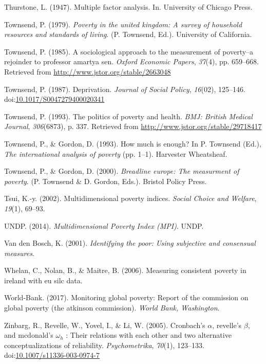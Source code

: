 \documentclass[]{book}
\begin{document}
\leavevmode\hypertarget{ref-Thurstone1947}{}%
Thurstone, L. (1947). Multiple factor analysis. In. University of Chicago Press.

\leavevmode\hypertarget{ref-Townsend1979}{}%
Townsend, P. (1979). \emph{Poverty in the united kingdom: A survey of household resources and standards of living}. (P. Townsend, Ed.). University of California.

\leavevmode\hypertarget{ref-Townsend1985}{}%
Townsend, P. (1985). A sociological approach to the measurement of poverty--a rejoinder to professor amartya sen. \emph{Oxford Economic Papers}, \emph{37}(4), pp. 659--668. Retrieved from \url{http://www.jstor.org/stable/2663048}

\leavevmode\hypertarget{ref-Townsend1987}{}%
Townsend, P. (1987). Deprivation. \emph{Journal of Social Policy}, \emph{16}(02), 125--146. doi:\href{https://doi.org/10.1017/S0047279400020341}{10.1017/S0047279400020341}

\leavevmode\hypertarget{ref-Townsend1993}{}%
Townsend, P. (1993). The politics of poverty and health. \emph{BMJ: British Medical Journal}, \emph{306}(6873), p. 337. Retrieved from \url{http://www.jstor.org/stable/29718417}

\leavevmode\hypertarget{ref-Townsend1993d}{}%
Townsend, P., \& Gordon, D. (1993). How much is enough? In P. Townsend (Ed.), \emph{The international analysis of poverty} (pp. 1--1). Harvester Wheatsheaf.

\leavevmode\hypertarget{ref-Townsend2000}{}%
Townsend, P., \& Gordon, D. (2000). \emph{Breadline europe: The measurment of poverty}. (P. Townsend \& D. Gordon, Eds.). Bristol Policy Press.

\leavevmode\hypertarget{ref-Tsui2002}{}%
Tsui, K.-y. (2002). Multidimensional poverty indices. \emph{Social Choice and Welfare}, \emph{19}(1), 69--93.

\leavevmode\hypertarget{ref-UNDP2014}{}%
UNDP. (2014). \emph{Multidimensional Poverty Index (MPI)}. UNDP.

\leavevmode\hypertarget{ref-VandenBosch2001}{}%
Van den Bosch, K. (2001). \emph{Identifying the poor: Using subjective and consensual measures}.

\leavevmode\hypertarget{ref-Whelan2006a}{}%
Whelan, C., Nolan, B., \& Maitre, B. (2006). Measuring consistent poverty in ireland with eu silc data.

\leavevmode\hypertarget{ref-Bank2017}{}%
World-Bank. (2017). Monitoring global poverty: Report of the commission on global poverty (the atkinson commission). \emph{World Bank, Washington}.

\leavevmode\hypertarget{ref-Zinbarg2005}{}%
Zinbarg, R., Revelle, W., Yovel, I., \& Li, W. (2005). Cronbach's \(\alpha\), revelle's \(\beta\), and mcdonald's \(\omega_h\) : Their relations with each other and two alternative conceptualizations of reliability. \emph{Psychometrika}, \emph{70}(1), 123--133. doi:\href{https://doi.org/10.1007/s11336-003-0974-7}{10.1007/s11336-003-0974-7}
\end{document}
